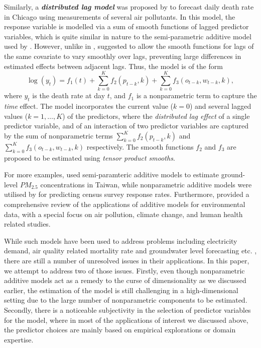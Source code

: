 \documentclass[11pt,a4paper,]{article}
\begin{document}
Similarly, a \textbf{\emph{distributed lag model}} was proposed by
\textcite{Wood2017} to forecast daily death rate in Chicago using
measurements of several air pollutants. In this model, the response
variable is modelled via a sum of smooth functions of lagged predictor
variables, which is quite similar in nature to the semi-parametric
additive model used by \textcite{FH2012}. However, unlike in
\textcite{FH2012}, \textcite{Wood2017} suggested to allow the smooth
functions for lags of the same covariate to vary smoothly over lags,
preventing large differences in estimated effects between adjacent lags.
Thus, the model is of the form \[
 \log(y_{t}) = f_{1}(t) + \sum_{k=0}^{K} f_{2}(p_{t-k}, k) + \sum_{k=0}^{K} f_{3}(o_{t-k}, w_{t-k}, k),
\] where \(y_{t}\) is the death rate at day \(t\), and \(f_{1}\) is a
nonparametric term to capture the \emph{time} effect. The model
incorporates the current value (\(k = 0\)) and several lagged values
(\(k = 1, \dots, K\)) of the predictors, where the \emph{distributed lag
effect} of a single predictor variable, and of an interaction of two
predictor variables are captured by the sum of nonparametric terms
\(\sum_{k=0}^{K} f_{2}(p_{t-k}, k)\) and
\(\sum_{k=0}^{K} f_{3}(o_{t-k}, w_{t-k}, k)\) respectively. The smooth
functions \(f_{2}\) and \(f_{3}\) are proposed to be estimated using
\emph{tensor product smooths}.

For more examples, \textcite{Ho2020} used semi-paramteric additive
models to estimate ground-level \(PM_{2.5}\) concentrations in Taiwan,
while nonparametric additive models were utilised by
\textcite{Ibrahim2021} for predicting census survey response rates.
Furthermore, \textcite{Ravindra2019} provided a comprehensive review of
the applications of additive models for environmental data, with a
special focus on air pollution, climate change, and human health related
studies.

While such models have been used to address problems including
electricity demand, air quality related mortality rate and groundwater
level forecasting etc.
\autocite{FH2012,HF2010,Wood2017,Peterson2014,Rajaee2019}, there are
still a number of unresolved issues in their applications. In this
paper, we attempt to address two of those issues. Firstly, even though
nonparametric additive models act as a remedy to the curse of
dimensionality as we discussed earlier, the estimation of the model is
still challenging in a high-dimensional setting due to the large number
of nonparametric components to be estimated. Secondly, there is a
noticeable subjectivity in the selection of predictor variables for the
model, where in most of the applications of interest we discussed above,
the predictor choices are mainly based on empirical explorations or
domain expertise.
\end{document}
